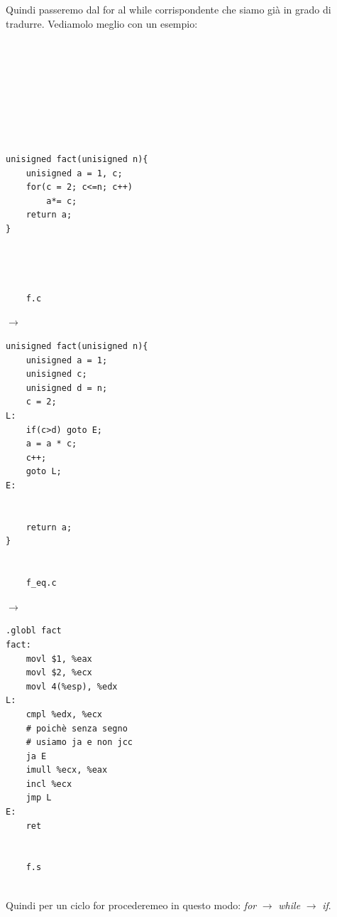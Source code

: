 \noindent Quindi passeremo dal for al while corrispondente che siamo già in grado di tradurre. Vediamolo meglio con un esempio: \medskip\\
\begin{minipage}{0.2\textwidth}
    \begin{verbatim}







    
unisigned fact(unisigned n){
    unisigned a = 1, c;
    for(c = 2; c<=n; c++)
        a*= c;
    return a;
}



    
    f.c
    \end{verbatim}
\end{minipage}
\hfill
$\longrightarrow$
\hfill
\begin{minipage}{0.2\textwidth}
    \begin{verbatim}
unisigned fact(unisigned n){
    unisigned a = 1;
    unisigned c;
    unisigned d = n;
    c = 2;
L:
    if(c>d) goto E;
    a = a * c;
    c++;
    goto L;
E:
    

    return a;
}


    f_eq.c
    \end{verbatim}
\end{minipage}
\hfill
$\longrightarrow$
\hfill
\begin{minipage}{0.2\textwidth}
    \begin{verbatim}
.globl fact
fact:
    movl $1, %eax
    movl $2, %ecx
    movl 4(%esp), %edx
L:
    cmpl %edx, %ecx
    # poichè senza segno 
    # usiamo ja e non jcc
    ja E      
    imull %ecx, %eax
    incl %ecx
    jmp L
E:
    ret

    
    f.s
    \end{verbatim}
\end{minipage}\medskip \\
\noindent Quindi per un ciclo for procederemeo in questo modo: \textit{for} $\rightarrow$ \textit{while} $\rightarrow$ \textit{if}.


